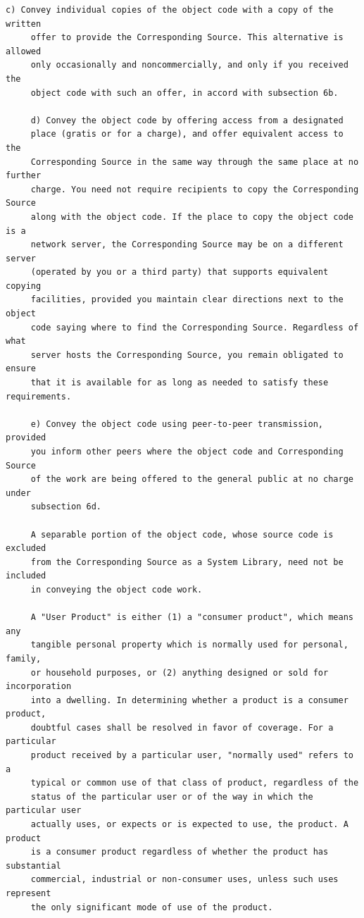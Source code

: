 \begin{lstlisting}[basicstyle=\ttfamily\footnotesize,breaklines=true]
     c) Convey individual copies of the object code with a copy of the written
     offer to provide the Corresponding Source. This alternative is allowed
     only occasionally and noncommercially, and only if you received the
     object code with such an offer, in accord with subsection 6b.

     d) Convey the object code by offering access from a designated
     place (gratis or for a charge), and offer equivalent access to the
     Corresponding Source in the same way through the same place at no further
     charge. You need not require recipients to copy the Corresponding Source
     along with the object code. If the place to copy the object code is a
     network server, the Corresponding Source may be on a different server
     (operated by you or a third party) that supports equivalent copying
     facilities, provided you maintain clear directions next to the object
     code saying where to find the Corresponding Source. Regardless of what
     server hosts the Corresponding Source, you remain obligated to ensure
     that it is available for as long as needed to satisfy these requirements.

     e) Convey the object code using peer-to-peer transmission, provided
     you inform other peers where the object code and Corresponding Source
     of the work are being offered to the general public at no charge under
     subsection 6d.

     A separable portion of the object code, whose source code is excluded
     from the Corresponding Source as a System Library, need not be included
     in conveying the object code work.

     A "User Product" is either (1) a "consumer product", which means any
     tangible personal property which is normally used for personal, family,
     or household purposes, or (2) anything designed or sold for incorporation
     into a dwelling. In determining whether a product is a consumer product,
     doubtful cases shall be resolved in favor of coverage. For a particular
     product received by a particular user, "normally used" refers to a
     typical or common use of that class of product, regardless of the
     status of the particular user or of the way in which the particular user
     actually uses, or expects or is expected to use, the product. A product
     is a consumer product regardless of whether the product has substantial
     commercial, industrial or non-consumer uses, unless such uses represent
     the only significant mode of use of the product.





\end{lstlisting}
